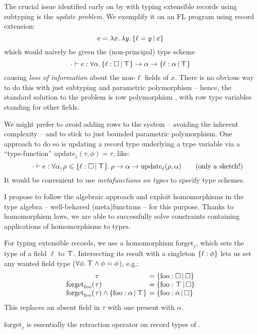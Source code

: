 The crucial issue identified early on by \textcite{operations-on-records} with typing extensible records using subtyping is the \emph{update problem}. We exemplify it on an FL program using record extension:
$$ e = \fllam x \fllam y \flext{\ell = y}{x} $$
which would naively be given the (non-principal) type scheme
$$ \cdot \vdash e : \forall \alpha \ldotp \flext{\ell : \flabsent}{\flftop} \to \alpha \to \flext{\ell : \alpha}{\flftop} $$
causing \emph{loss of information} about the non-$\ell$ fields of $x$. There is no obvious way to do this with just subtyping and parametric polymorphism -- hence, the standard solution to the problem is row polymorphism \cite{remy-records}, with row type variables standing for other fields. 

We might prefer to avoid adding rows to the system -- avoiding the inherent complexity -- and to stick to just bounded parametric polymorphism. One approach to do so is updating a record type underlying a type variable via a \enquote{type-function} $\mathrm{update}_\ell(\tau, \phi) = \tau$, like:
$$ \qquad \cdot \vdash e : \forall \alpha, \rho \sub \flext{\ell : \flabsent}{\flftop} \ldotp \rho \to \alpha \to \mathrm{update}_\ell(\rho, \alpha) \qquad \text{(only a sketch!)} $$
It would be convenient to use \emph{metafunctions on types} to specify type schemes.

I propose to follow the algebraic approach and exploit homomorphisms in the type algebra -- well-behaved (meta)functions -- for this purpose. Thanks to homomorphism laws, we are able to successfully solve constraints containing applications of homomorphisms to types.
\begin{example}
    For typing extensible records, we use a homomorphism $\mathrm{forget}_\ell$, which sets the type of a field $\ell$ to $\top \!\!\!\! \top$.
    Intersecting its result with a singleton $\flrec{\ell : \phi}$ lets us set any wanted field type ($\forall \phi \ldotp \top \!\!\!\! \top \land \phi = \phi$), e.g.\@:
    \setlength{\tabcolsep}{0pt}
    $$\begin{array}{rll}
        &\hspace{-0.9em}\tau &\;\hspace{-0.9em}= \flext{\mathrm{foo}: \flabsent}{\flabsent} \\
        \mathrm{forget}_\mathrm{foo}( &\hspace{-0.9em}\tau ) &\;\hspace{-0.9em}= \flext{\mathrm{foo}: \flftop}{\flabsent} \\
        \mathrm{forget}_\mathrm{foo}( &\hspace{-0.9em}\tau ) \meet \flext{\mathrm{foo}: \alpha}{\flftop} &\;\hspace{-0.9em}= \flext{\mathrm{foo}: \alpha}{\flabsent}
    \end{array}$$
    This replaces an absent field in $\tau$ with one present with $\alpha$.

    $\mathrm{forget}_\ell$ is essentially the retraction operator on record types of \textcite{operations-on-records}.
\end{example}

